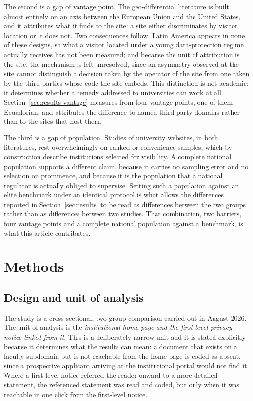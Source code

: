 \documentclass[pdflatex,sn-basic,Numbered,iicol]{sn-jnl}
\theoremstyle{thmstyleone}
\theoremstyle{thmstyletwo}
\theoremstyle{thmstylethree}
\begin{document}
	The second is a gap of vantage point. The geo-differential literature is built almost entirely on an axis between the European Union and the United States, and it attributes what it finds to the site: a site either discriminates by visitor location or it does not. Two consequences follow. Latin America appears in none of these designs, so what a visitor located under a young data-protection regime actually receives has not been measured; and because the unit of attribution is the site, the mechanism is left unresolved, since an asymmetry observed at the site cannot distinguish a decision taken by the operator of the site from one taken by the third parties whose code the site embeds. This distinction is not academic: it determines whether a remedy addressed to universities can work at all. Section~\ref{sec:results-vantage} measures from four vantage points, one of them Ecuadorian, and attributes the difference to named third-party domains rather than to the sites that host them.
	
	The third is a gap of population. Studies of university websites, in both literatures, rest overwhelmingly on ranked or convenience samples, which by construction describe institutions selected for visibility. A complete national population supports a different claim, because it carries no sampling error and no selection on prominence, and because it is the population that a national regulator is actually obliged to supervise. Setting such a population against an elite benchmark under an identical protocol is what allows the differences reported in Section~\ref{sec:results} to be read as differences between the two groups rather than as differences between two studies. That combination, two barriers, four vantage points and a complete national population against a benchmark, is what this article contributes.
	
	\section{Methods}\label{sec:methods}
	
	\subsection{Design and unit of analysis}\label{sec:methods-design}
	
	The study is a cross-sectional, two-group comparison carried out in August 2026. The unit of analysis is the \emph{institutional home page and the first-level privacy notice linked from it}. This is a deliberately narrow unit and it is stated explicitly because it determines what the results can mean: a document that exists on a faculty subdomain but is not reachable from the home page is coded as absent, since a prospective applicant arriving at the institutional portal would not find it. Where a first-level notice referred the reader onward to a more detailed statement, the referenced statement was read and coded, but only when it was reachable in one click from the first-level notice.
	
\end{document}
